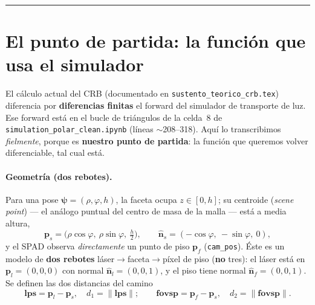 \documentclass[11pt,a4paper]{article}
\theoremstyle{plain}
\theoremstyle{definition}
\newcommand{\vect}[1]{\boldsymbol{#1}}
\newcommand{\norm}[1]{\left\lVert #1 \right\rVert}
\begin{document}
\tableofcontents
\bigskip\hrule\bigskip

\section{El punto de partida: la funci\'on que usa el simulador}
\label{sec:partida}

El c\'alculo actual del CRB (documentado en \texttt{sustento\_teorico\_crb.tex})
diferencia por \textbf{diferencias finitas} el forward del simulador de
transporte de luz. Ese forward est\'a en el bucle de tri\'angulos de la celda~8
de \texttt{simulation\_polar\_clean.ipynb} (l\'ineas $\sim$208--318). Aqu\'i lo
transcribimos \emph{fielmente}, porque es \textbf{nuestro punto de partida}: la
funci\'on que queremos volver diferenciable, tal cual est\'a.

\paragraph{Geometr\'ia (dos rebotes).}
Para una pose $\vect{\psi}=(\rho,\varphi,h)$, la faceta ocupa $z\in[0,h]$; su
centroide (\emph{scene point}) --- el an\'alogo puntual del centro de masa de la
malla --- est\'a a media altura,
\begin{equation}
    \vect{p}_s=\bigl(\rho\cos\varphi,\ \rho\sin\varphi,\ \tfrac{h}{2}\bigr),
    \qquad
    \hat{\vect n}_s=(-\cos\varphi,\ -\sin\varphi,\ 0),
    \label{eq:pose}
\end{equation}
y el SPAD observa \emph{directamente} un punto de piso $\vect{p}_f$
(\texttt{cam\_pos}). \'Este es un modelo de \textbf{dos rebotes}
l\'aser$\to$faceta$\to$p\'ixel de piso (\textbf{no} tres): el l\'aser est\'a en
$\vect{p}_l=(0,0,0)$ con normal $\hat{\vect n}_l=(0,0,1)$, y el piso tiene normal
$\hat{\vect n}_f=(0,0,1)$. Se definen las dos distancias del camino
\begin{equation}
    \vect{lps}=\vect{p}_l-\vect{p}_s,\quad d_1=\norm{\vect{lps}};
    \qquad
    \vect{fovsp}=\vect{p}_f-\vect{p}_s,\quad d_2=\norm{\vect{fovsp}}.
    \label{eq:dist}
\end{equation}
\end{document}
